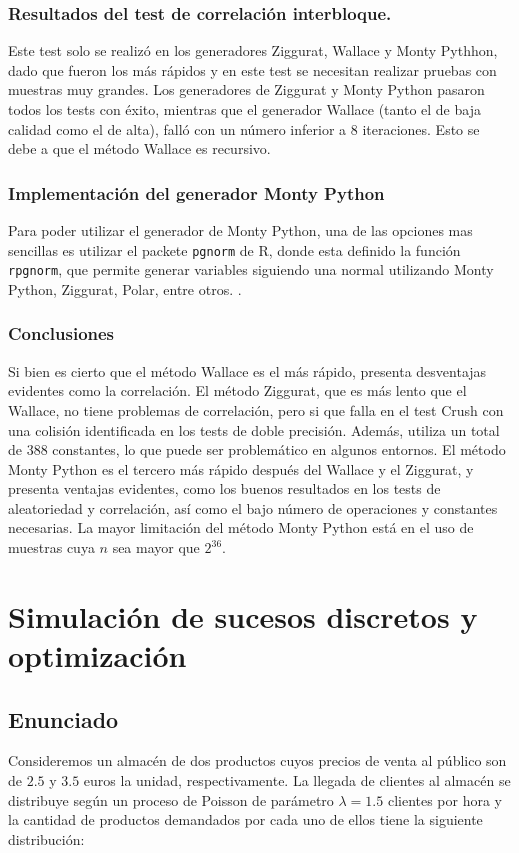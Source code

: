 \documentclass[a4paper,12pt]{article}
\begin{document}
	\subsubsection{Resultados del test de correlación interbloque.}
	Este test solo se realizó en los generadores Ziggurat, Wallace y Monty Pythhon, dado que fueron los más rápidos y en este test se necesitan realizar pruebas con muestras muy grandes. Los generadores de Ziggurat y Monty Python pasaron todos los tests con éxito, mientras que el generador Wallace (tanto el de baja calidad como el de alta), falló con un número inferior a $8$ iteraciones. Esto se debe a que el método Wallace es recursivo.
	
	\subsubsection{Implementación del generador Monty Python}
	Para poder utilizar el generador de Monty Python, una de las opciones mas sencillas es utilizar el packete \texttt{pgnorm} de R, donde esta definido la función \texttt{rpgnorm},
	que permite generar variables siguiendo una normal utilizando Monty Python, Ziggurat, Polar, entre otros. \cite{mp}. 

	\subsubsection{Conclusiones}
	Si bien es cierto que el método Wallace es el más rápido, presenta desventajas evidentes como la correlación. 
	El método Ziggurat, que es más lento que el Wallace, no tiene problemas de correlación, pero si que falla en el test Crush con una colisión identificada en los tests de doble precisión. 
	Además, utiliza un total de $388$ constantes, lo que puede ser problemático en algunos entornos. 
	El método Monty Python es el tercero más rápido después del Wallace y el Ziggurat, y presenta ventajas evidentes, como los buenos resultados en los tests de aleatoriedad y correlación, así como el bajo número de operaciones y constantes necesarias. 
	La mayor limitación del método Monty Python está en el uso de muestras cuya $n$ sea mayor que $2^{36}$. 
	
	
	\newpage

	\section{Simulación de sucesos discretos y optimización}

	\subsection{Enunciado}
	Consideremos un almacén de dos productos cuyos precios de venta al público son de $2.5$ y $3.5$ euros la unidad, respectivamente. La llegada de clientes al almacén se distribuye según un proceso de Poisson de parámetro $\lambda = 1.5$ clientes por hora y la cantidad de productos demandados por cada uno de ellos tiene la siguiente distribución:
\end{document}
